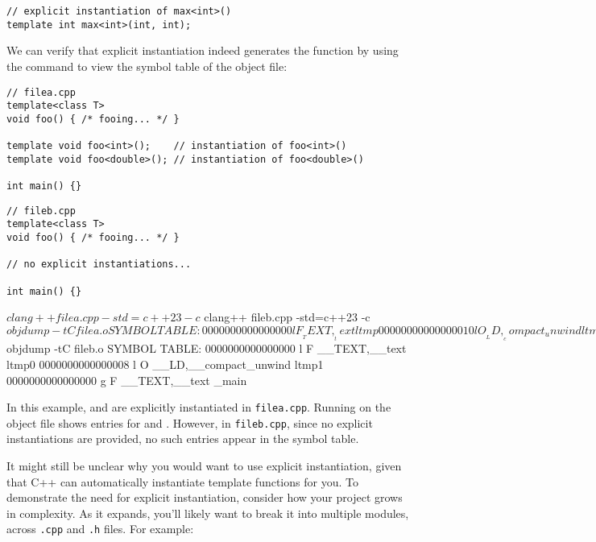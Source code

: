 \documentclass[12pt]{article}
\begin{document}
\begin{lstlisting}[style=cxx]
// explicit instantiation of max<int>()
template int max<int>(int, int);
\end{lstlisting}

\noindent
We can verify that explicit instantiation indeed generates the function by using the  command to view the symbol table of the object file:

\begin{lstlisting}[style=cxx]
// filea.cpp
template<class T>
void foo() { /* fooing... */ }

template void foo<int>();    // instantiation of foo<int>()
template void foo<double>(); // instantiation of foo<double>()

int main() {}
\end{lstlisting}

\begin{lstlisting}[style=cxx]
// fileb.cpp
template<class T>
void foo() { /* fooing... */ }

// no explicit instantiations...

int main() {}
\end{lstlisting}

\begin{terminal}
$ clang++ filea.cpp -std=c++23 -c
$ clang++ fileb.cpp -std=c++23 -c
$ objdump -tC filea.o
SYMBOL TABLE:
0000000000000000 l     F __TEXT,__text ltmp0
0000000000000010 l     O __LD,__compact_unwind ltmp1
0000000000000004  w    F __TEXT,__text void foo<double>()
0000000000000000  w    F __TEXT,__text void foo<int>()
0000000000000008 g     F __TEXT,__text _main
$ objdump -tC fileb.o
SYMBOL TABLE:
0000000000000000 l     F __TEXT,__text ltmp0
0000000000000008 l     O __LD,__compact_unwind ltmp1
0000000000000000 g     F __TEXT,__text _main
\end{terminal}

\begin{explanation}
\noindent
    In this example,  and  are explicitly instantiated in \texttt{filea.cpp}.
    Running  on the object file shows entries for  and .
However, in \texttt{fileb.cpp}, since no explicit instantiations are provided, no such entries appear in the symbol table.
\end{explanation}

\noindent
It might still be unclear why you would want to use explicit instantiation, given that C++ can automatically instantiate template functions for you.
To demonstrate the need for explicit instantiation, consider how your project grows in complexity.
As it expands, you'll likely want to break it into multiple modules, across \texttt{.cpp} and \texttt{.h} files.
For example:
\end{document}
